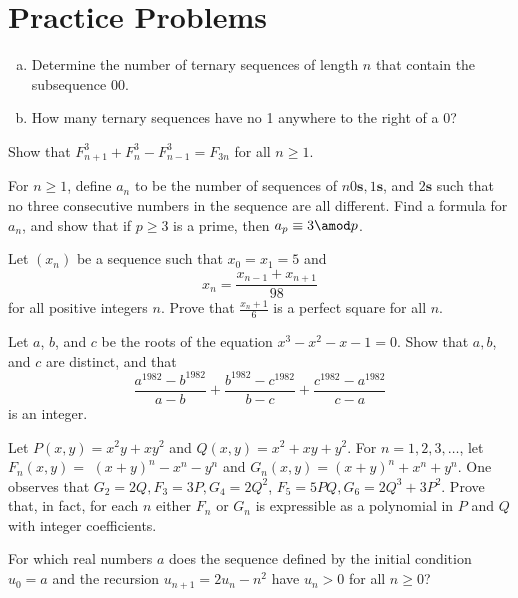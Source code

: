 \documentclass[11pt]{scrartcl}
\begin{document}
\section{Practice Problems}
\begin{problem}
\begin{enumerate}[(a)]
    \item Determine the number of ternary sequences of length \(n\) that contain the subsequence \(00\).
    \item How many ternary sequences have no 1 anywhere to the right of a \(0\)?
\end{enumerate}
\end{problem}
\begin{problem}
Show that \(F_{n+1}^{3}+F_{n}^{3}-F_{n-1}^{3}=F_{3 n}\) for all \(n \geq 1\).
\end{problem}
\begin{problem}
For \(n \geq 1\), define \(a_{n}\) to be the number of sequences of \(n 0 \mathbf{s}, 1 \mathbf{s}\), and \(2 \mathbf{s}\) such that no three consecutive numbers in the sequence are all different. Find a formula for \(a_{n}\), and show that if \(p \geq 3\) is a prime, then \(a_{p} \equiv 3 \amod p\).
\end{problem}
\begin{problem}
Let \(\left(x_n\right) \) be a sequence such that \(x_0 = x_1 = 5\) and
\[x_n = \frac{x_{n-1} + x_{n+1}}{98}\]
for all positive integers \(n\). Prove that \(\frac{x_{n}+1}{6}\) is a perfect square for all \(n\).
\end{problem}
\begin{problem}[Canada 1982]
Let \(a\), \(b\), and \(c\) be the roots of the equation \(x^{3}-x^{2}-x-1=0\). Show that \(a, b\), and \(c\) are distinct, and that
\[
\frac{a^{1982}-b^{1982}}{a-b}+\frac{b^{1982}-c^{1982}}{b-c}+\frac{c^{1982}-a^{1982}}{c-a}
\]
is an integer.
\end{problem}
\begin{problem}[Putnam 1976]
Let \(P(x, y)=x^{2} y+x y^{2}\) and \(Q(x, y)=x^{2}+x y+y^{2}\). For \(n=1,2,3, \ldots\), let \(F_{n}(x, y)=\) \((x+y)^{n}-x^{n}-y^{n}\) and \(G_{n}(x, y)=(x+y)^{n}+x^{n}+y^{n}\).
One observes that \(G_{2}=2 Q, F_{3}=3 P, G_{4}=2 Q^{2}\), \(F_{5}=5 P Q, G_{6}=2 Q^{3}+3 P^{2}\). Prove that, in fact, for each \(n\) either \(F_{n}\) or \(G_{n}\) is expressible as a polynomial in \(P\) and \(Q\) with integer coefficients.
\end{problem}
\begin{problem}[Putnam 1980]
For which real numbers \(a\) does the sequence defined by the initial condition \(u_{0}=a\) and the recursion \(u_{n+1}=2 u_{n}-n^{2}\) have \(u_{n}>0\) for all \(n \geq 0\)?
\end{problem}
\end{document}
